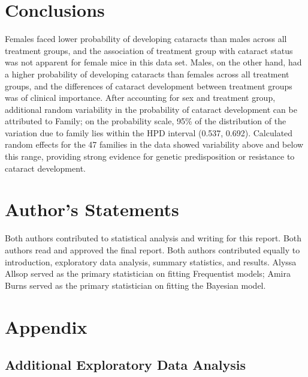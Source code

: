 \documentclass[12pt]{article}
\begin{document}
\section{Conclusions}
\label{sec:conc}

Females faced lower probability of developing cataracts than males across all treatment groups, and the association of treatment group with cataract status was not apparent for female mice in this data set. Males, on the other hand, had a higher probability of developing cataracts than females across all treatment groups, and the differences of cataract development between treatment groups was of clinical importance. After accounting for sex and treatment group, additional random variability in the probability of cataract development can be attributed to Family; on the probability scale, 95\% of the distribution of the variation due to family lies within the HPD interval (0.537, 0.692). Calculated random effects for the 47 families in the data showed variability above and below this range, providing strong evidence for genetic predisposition or resistance to cataract development.

\section{Author's Statements}
\label{sec:auth}

Both authors contributed to statistical analysis and writing for this report. Both authors read and approved the final report. Both authors contributed equally to introduction, exploratory data analysis, summary statistics, and results. Alyssa Allsop served as the primary statistician on fitting Frequentist models; Amira Burns served as the primary statistician on fitting the Bayesian model.

\newpage

\appendix

\section{Appendix}

\hypertarget{additional-exploratory-data-analysis}{%
\subsection{Additional Exploratory Data Analysis}\label{additional-exploratory-data-analysis}}

\label{sec:appeda}
\end{document}
